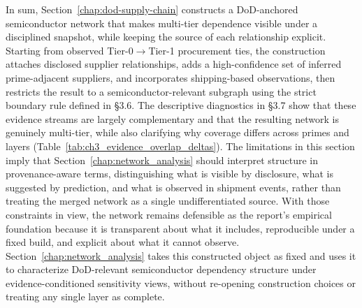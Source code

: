In sum, Section~\ref{chap:dod-supply-chain} constructs a DoD-anchored semiconductor network that makes multi-tier dependence visible under a disciplined snapshot, while keeping the source of each relationship explicit. Starting from observed Tier-0$\rightarrow$Tier-1 procurement ties, the construction attaches disclosed supplier relationships, adds a high-confidence set of inferred prime-adjacent suppliers, and incorporates shipping-based observations, then restricts the result to a semiconductor-relevant subgraph using the strict boundary rule defined in \S3.6. The descriptive diagnostics in \S3.7 show that these evidence streams are largely complementary and that the resulting network is genuinely multi-tier, while also clarifying why coverage differs across primes and layers (Table~\ref{tab:ch3_evidence_overlap_deltas}). The limitations in this section imply that Section~\ref{chap:network_analysis} should interpret structure in provenance-aware terms, distinguishing what is visible by disclosure, what is suggested by prediction, and what is observed in shipment events, rather than treating the merged network as a single undifferentiated source. With those constraints in view, the network remains defensible as the report's empirical foundation because it is transparent about what it includes, reproducible under a fixed build, and explicit about what it cannot observe. Section~\ref{chap:network_analysis} takes this constructed object as fixed and uses it to characterize DoD-relevant semiconductor dependency structure under evidence-conditioned sensitivity views, without re-opening construction choices or treating any single layer as complete.

